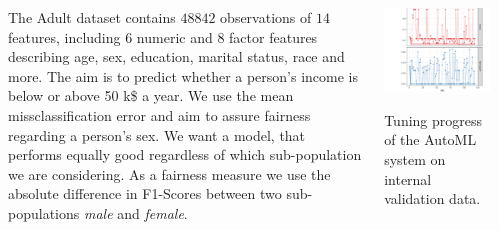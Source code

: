 \documentclass[portrait, 25pt, a0paper, blockverticalspace=0.6cm, innermargin=0.6cm, colspace=0.5cm]{tikzposter}\usepackage[]{graphicx}\usepackage[]{color}
\begin{document}
\begin{columns}
{{  }
  \vspace{-.2cm}
  }
  {
  The Adult dataset contains $48842$ observations of $14$ features, including $6$
  numeric and $8$ factor features describing age, sex, education, marital status, race and more.
  The aim is to predict whether a person's income is below or above 50 k\$ a year.
  We use the mean missclassification error and aim to assure fairness regarding a person's sex.
  We want a model, that performs equally good regardless of which sub-population we are considering.
  As a fairness measure we use the absolute difference in F1-Scores between two sub-populations \textit{male} and \textit{female}.

  \vspace{.4cm}
  \begin{centering}
  \includegraphics[width=0.8\linewidth]{figures/opt_path.png}

  Tuning progress of the AutoML system on internal validation data.
  \end{centering}
  }
\end{columns}
\end{document}
